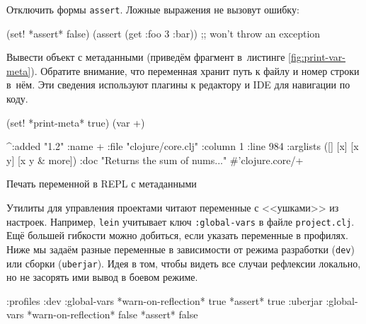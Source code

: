 \fi

Отключить формы \verb|assert|. Ложные выражения не вызовут ошибку:

\begin{english}
  \begin{clojure}
(set! *assert* false)
(assert (get {:foo 3} :bar))
;; won't throw an exception
  \end{clojure}
\end{english}

Вывести объект с метаданными (приведём фрагмент в~листинге
\ref{fig:print-var-meta}). Обратите внимание, что переменная хранит путь к файлу
и номер строки в~нём. Эти сведения используют плагины к редактору и IDE для
навигации по коду.

\begin{listing}[ht!]

\begin{english}
  \begin{clojure}
(set! *print-meta* true)
(var +)

^{:added "1.2"
  :name +
  :file "clojure/core.clj"
  :column 1
  :line 984
  :arglists ([] [x] [x y] [x y & more])
  :doc "Returns the sum of nums..."}
#'clojure.core/+
  \end{clojure}
\end{english}

\caption{Печать переменной в REPL с метаданными}
\label{fig:print-var-meta}

\end{listing}


Утилиты для управления проектами читают переменные с <<ушками>> из
настроек. Например, \verb|lein| учитывает ключ \verb|:global-vars| в файле
\verb|project.clj|. Ещё большей гибкости можно добиться, если указать переменные
в профилях. Ниже мы задаём разные переменные в зависимости от режима разработки
(\verb|dev|) или сборки (\verb|uberjar|). Идея в том, чтобы видеть все случаи
рефлексии локально, но не засорять ими вывод в боевом режиме.

\ifnarrow

\begin{english}
  \begin{clojure}
{:profiles
 :dev {:global-vars
       {*warn-on-reflection* true
        *assert* true}}
 :uberjar {:global-vars
           {*warn-on-reflection* false
            *assert* false}}}
  \end{clojure}
\end{english}

